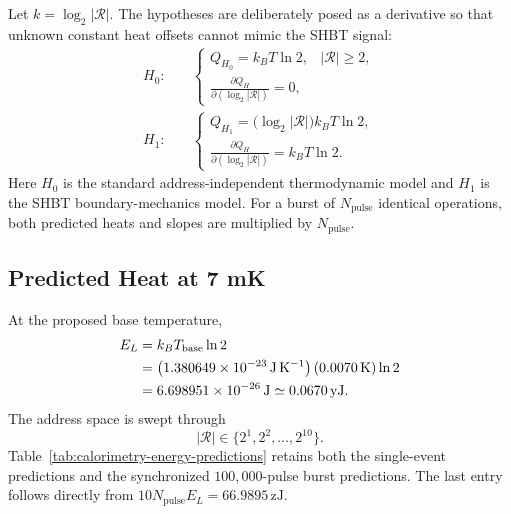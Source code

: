 \documentclass[11pt,letterpaper]{article}
\theoremstyle{plain}
\begin{document}
Let \(k=\log_2|\mathcal R|\).  The hypotheses are deliberately posed as a
derivative so that unknown constant heat offsets cannot mimic the SHBT signal:
\begin{align}
\label{eq:calorimetry-null-hypothesis}
 H_0:\quad
 &\begin{cases}
 Q_{H_0}=k_B T\ln2, & |\mathcal R|\ge2,\\[0.2em]
 \displaystyle
 \frac{\partial Q_H}{\partial(\log_2|\mathcal R|)}=0,
 &
 \end{cases}
\\
\label{eq:calorimetry-alternative-hypothesis}
 H_1:\quad
 &\begin{cases}
 Q_{H_1}=\bigl(\log_2|\mathcal R|\bigr)k_B T\ln2,\\[0.2em]
 \displaystyle
 \frac{\partial Q_H}{\partial(\log_2|\mathcal R|)}=k_B T\ln2.
 \end{cases}
\end{align}
Here \(H_0\) is the standard address-independent thermodynamic model and
\(H_1\) is the SHBT boundary-mechanics model.  For a burst of
\(N_{\text{pulse}}\) identical operations, both predicted heats and slopes are
multiplied by \(N_{\text{pulse}}\).

\subsection{Predicted Heat at 7 mK}
\label{sec:calorimetry-predictions}

At the proposed base temperature,
\begin{align}
\label{eq:calorimetry-landauer-quantum}
 E_L
 &=
 k_B T_{\text{base}}\ln2
 \notag\\
 &=
 \left(1.380649\times10^{-23}\,\mathrm{J\,K^{-1}}\right)
 \left(0.0070\,\mathrm{K}\right)\ln2
 \notag\\
 &=
 6.698951\times10^{-26}\,\mathrm{J}
 \simeq
 0.0670\,\mathrm{yJ}.
\end{align}
The address space is swept through
\begin{equation}
\label{eq:calorimetry-address-sweep}
 |\mathcal R|
 \in
 \{2^1,2^2,\ldots,2^{10}\}.
\end{equation}
Table~\ref{tab:calorimetry-energy-predictions} retains both the single-event
predictions and the synchronized \(100{,}000\)-pulse burst predictions.  The
last entry follows directly from \(10N_{\text{pulse}}E_L=66.9895\,\mathrm{zJ}\).
\end{document}
